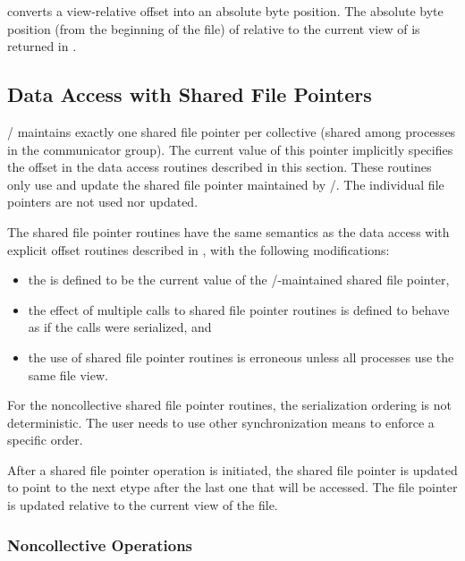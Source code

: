  converts a view-relative offset
into an absolute byte position.
The absolute byte position (from the beginning of the file)
of  relative to the current view of 
is returned in .

\subsection{Data Access with Shared File Pointers}
\label{sec:io-shared-ptr}

\MPI/ maintains exactly one shared file pointer
per collective 
(shared among processes in the communicator group).
The current value of this pointer implicitly specifies
the offset in the data access routines described in this section.
These routines only use and update the shared file pointer
maintained by \MPI/.
The individual file pointers are not used nor updated.

The shared file pointer routines
have the same semantics as the data access with explicit offset routines
described in ,
with the following modifications:
\begin{itemize}
\item the  is defined to be the current value
        of the \MPI/-maintained shared file pointer,
\item the effect of multiple calls to shared file pointer routines
        is defined to behave as if the calls were serialized, and
\item the use of shared file pointer routines is erroneous unless
        all processes use the same file view.
\end{itemize}
For the noncollective shared file pointer routines,
the
serialization ordering is not deterministic.
The user needs to use other synchronization means
to enforce a specific order.

After a shared file pointer operation is initiated,
the shared file pointer is updated to point to the next
etype after the last one 
that will be accessed.
The file pointer is updated relative to the current view of the file.


\subsubsection{Noncollective Operations}
\label{sec:io-shared-ptr-ind}

